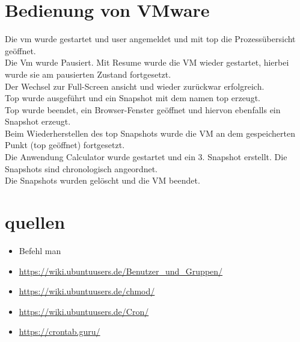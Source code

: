 \documentclass[12pt]{article}
\theoremstyle{plain}
\begin{document}
\section{Bedienung von VMware}
Die vm wurde gestartet und user angemeldet und mit top die Prozessübersicht geöffnet.\\
Die Vm wurde Pausiert. Mit Resume wurde die VM wieder gestartet, hierbei wurde sie am pausierten Zustand fortgesetzt.\\
Der Wechsel zur Full-Screen ansicht und wieder zurückwar erfolgreich.\\
Top wurde ausgeführt und ein Snapshot mit dem namen top erzeugt.\\
Top wurde beendet, ein Browser-Fenster geöffnet und hiervon ebenfalls ein Snapshot erzeugt.\\
Beim Wiederherstellen des top Snapshots wurde die VM an dem gespeicherten Punkt (top geöffnet) fortgesetzt.\\
Die Anwendung Calculator wurde gestartet und ein 3. Snapshot erstellt. Die Snapshots sind chronologisch angeordnet.\\
Die Snapshots wurden gelöscht und die VM beendet.\\

\section{quellen}
\begin{itemize}
\item Befehl man
\item \url{https://wiki.ubuntuusers.de/Benutzer_und_Gruppen/}
\item \url{https://wiki.ubuntuusers.de/chmod/}
\item \url{https://wiki.ubuntuusers.de/Cron/}
\item \url{https://crontab.guru/}
\end{itemize}
\end{document}
